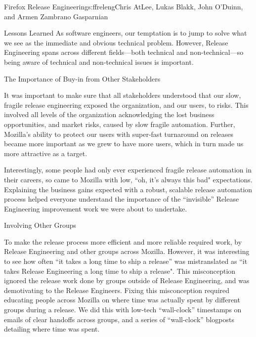 \begin{aosachapter}{Firefox Release Engineering}{s:ffreleng}{Chris AtLee, Lukas Blakk, John O'Duinn, and Armen Zambrano Gasparnian}
\begin{aosasect1}{Lessons Learned}
As software engineers, our temptation is to jump to solve what we
see as the immediate and obvious technical problem. However, Release
Engineering spans across different fields---both technical and 
non-technical---so being aware of technical and non-technical issues is important.

\begin{aosasect2}{The Importance of Buy-in from Other Stakeholders}

It was important to make sure that all stakeholders understood that our
slow, fragile release engineering exposed the organization, and our users, to
risks. This involved all levels of the organization acknowledging the lost business opportunities, and market risks, caused by slow
fragile automation. Further, Mozilla's ability to
protect our users with super-fast turnaround on releases became more important
as we grew to have more users, which in turn made us more attractive as a
target.

Interestingly, some people had only ever experienced fragile release automation
in their careers, so came to Mozilla with low, ``oh, it's always this bad"
expectations. Explaining the business gains expected with a robust, scalable
release automation process helped everyone understand the importance of the
``invisible'' Release Engineering improvement work we were about to undertake.

\end{aosasect2}

\begin{aosasect2}{Involving Other Groups}

To make the release process more efficient and more reliable required work, by
Release Engineering and other groups across Mozilla. However, it was
interesting to see how often ``it takes a long time to ship a release'' was
mistranslated as ``it takes Release Engineering a long time to ship a release".
This misconception ignored the release work done by groups outside of Release
Engineering, and was demotivating to the Release Engineers. Fixing this
misconception required educating people across Mozilla on where time was
actually spent by different groups during a release.  We did this with low-tech
``wall-clock'' timestamps on emails of clear handoffs across groups, and a series
of ``wall-clock'' blogposts detailing where time was spent.


\end{aosasect2}
\end{aosasect1}
\end{aosachapter}
